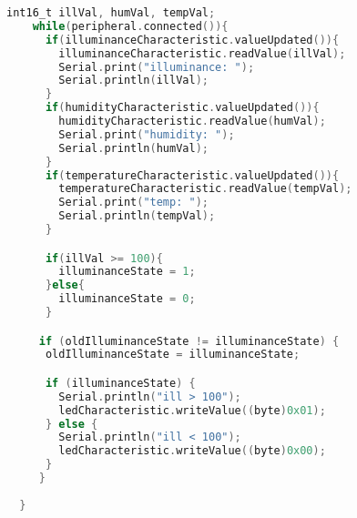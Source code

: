 \documentclass{article}
\begin{document}
\begin{lstlisting}[style=CStyle, language=C, caption=Abonnieren der Charakteristiken (Temp)]
int16_t illVal, humVal, tempVal;
    while(peripheral.connected()){
      if(illuminanceCharacteristic.valueUpdated()){
        illuminanceCharacteristic.readValue(illVal);
        Serial.print("illuminance: ");
        Serial.println(illVal);    
      }
      if(humidityCharacteristic.valueUpdated()){
        humidityCharacteristic.readValue(humVal);
        Serial.print("humidity: ");
        Serial.println(humVal);    
      }
      if(temperatureCharacteristic.valueUpdated()){
        temperatureCharacteristic.readValue(tempVal);
        Serial.print("temp: ");
        Serial.println(tempVal);    
      }    

      if(illVal >= 100){
        illuminanceState = 1;                
      }else{
        illuminanceState = 0;
      }

     if (oldIlluminanceState != illuminanceState) {
      oldIlluminanceState = illuminanceState;

      if (illuminanceState) {
        Serial.println("ill > 100");
        ledCharacteristic.writeValue((byte)0x01);
      } else {
        Serial.println("ill < 100");
        ledCharacteristic.writeValue((byte)0x00);
      }
     }
    
  }
\end{lstlisting}
\end{document}
